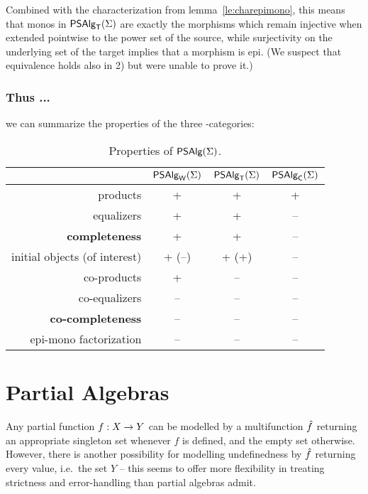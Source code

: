 \documentclass[10pt]{article}
\begin{document}
Combined with the characterization from lemma~\ref{le:charepimono},
this means that monos in $\mbox{\sf PSAlg}_{\sf T}(\Sigma)$ are exactly the morphisms which
remain injective when extended pointwise to the power set of the
source, while surjectivity on the underlying set of the target implies
that a morphism is epi. (We suspect that equivalence holds also in 2)
but were unable to prove it.)

\subsubsection*{Thus ...}
we can summarize the properties of the three \PS-categories:

\begin{table}[htb] 
\begin{center}
\begin{tabular}{|r|c|c|c|}
\hline
    & $\mbox{\sf PSAlg}_{\sf W}(\Sigma)$ & $\mbox{\sf PSAlg}_{\sf T}(\Sigma)$ & $\mbox{\sf PSAlg}_{\sf C}(\Sigma)$ \\ \hline
products       &+ & +   & + \\
equalizers     &+ & +   & -- \\
{\bf completeness} &+ & +   & -- \\ \hline
initial objects (of interest) &+ (--) & + (+)  & -- \\
co-products    &+ & --  & -- \\
co-equalizers  &-- & --  & -- \\
{\bf co-completeness}&-- & -- & -- \\ \hline
epi-mono factorization   &-- & --   & -- \\ \hline
\end{tabular}
\caption{Properties of $\mbox{\sf PSAlg}(\Sigma)$.}\label{tab:B}
\end{center}
\end{table}



\section{Partial Algebras}
\label{se:pa}

Any partial function $f : X \rightarrow Y$ can be modelled by a
multifunction $\hat{f}$ returning an appropriate singleton set whenever
$f$ is defined, and the empty set
otherwise. However, there is another possibility for modelling
undefinedness by $\hat{f}$
returning every value, i.e.\ the set $Y$ -- this seems to
offer more flexibility in treating strictness and error-handling than
 partial algebras admit.
\end{document}
